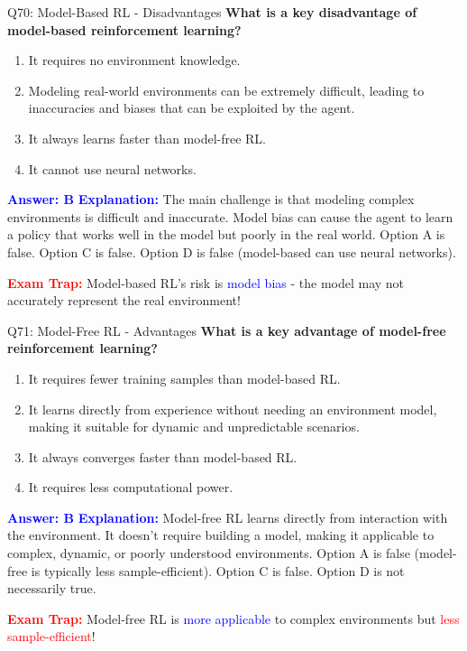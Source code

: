 \documentclass[8pt]{beamer}
\begin{document}
	\begin{frame}{Q70: Model-Based RL - Disadvantages}
		\fontsize{6.5}{7.5}\selectfont
		\textbf{What is a key disadvantage of model-based reinforcement learning?}
		
		\begin{enumerate}
			\item It requires no environment knowledge.
			\item Modeling real-world environments can be extremely difficult, leading to inaccuracies and biases that can be exploited by the agent.
			\item It always learns faster than model-free RL.
			\item It cannot use neural networks.
		\end{enumerate}
		
		\vspace{0.1cm}
		\textcolor{blue}{\textbf{Answer: B}}
		\vspace{0.1cm}
		\textcolor{blue}{\textbf{Explanation:}} The main challenge is that modeling complex environments is difficult and inaccurate. Model bias can cause the agent to learn a policy that works well in the model but poorly in the real world. Option A is false. Option C is false. Option D is false (model-based can use neural networks).
		
		\textcolor{red}{\textbf{Exam Trap:}} Model-based RL's risk is \textcolor{blue}{model bias} - the model may not accurately represent the real environment!
	\end{frame}
	
	\begin{frame}{Q71: Model-Free RL - Advantages}
		\fontsize{6.5}{7.5}\selectfont
		\textbf{What is a key advantage of model-free reinforcement learning?}
		
		\begin{enumerate}
			\item It requires fewer training samples than model-based RL.
			\item It learns directly from experience without needing an environment model, making it suitable for dynamic and unpredictable scenarios.
			\item It always converges faster than model-based RL.
			\item It requires less computational power.
		\end{enumerate}
		
		\vspace{0.1cm}
		\textcolor{blue}{\textbf{Answer: B}}
		\vspace{0.1cm}
		\textcolor{blue}{\textbf{Explanation:}} Model-free RL learns directly from interaction with the environment. It doesn't require building a model, making it applicable to complex, dynamic, or poorly understood environments. Option A is false (model-free is typically less sample-efficient). Option C is false. Option D is not necessarily true.
		
		\textcolor{red}{\textbf{Exam Trap:}} Model-free RL is \textcolor{blue}{more applicable} to complex environments but \textcolor{red}{less sample-efficient}!
	\end{frame}
	
\end{document}
